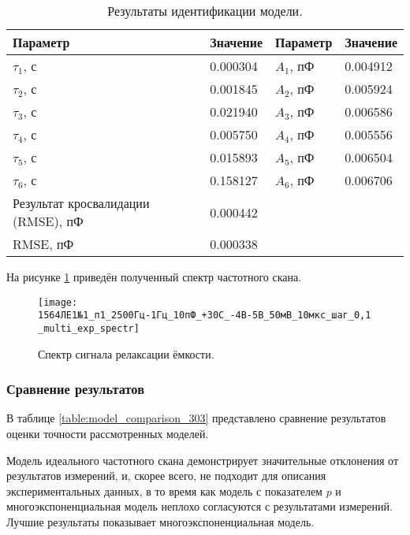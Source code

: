 	\begin{table}[!htp]
		\centering
		\caption{Результаты идентификации модели.}
		\begin{tabular}{|l|l|l|l|}
			\hline
			Параметр                           & Значение & Параметр  & Значение \\ \hline
			$\tau_1$, с                        & 0.000304 & $A_1$, пФ & 0.004912 \\ \hline
			$\tau_2$, с                        & 0.001845 & $A_2$, пФ & 0.005924 \\ \hline
			$\tau_3$, с                        & 0.021940 & $A_3$, пФ & 0.006586 \\ \hline
			$\tau_4$, с                        & 0.005750 & $A_4$, пФ & 0.005556 \\ \hline
			$\tau_5$, с                        & 0.015893 & $A_5$, пФ & 0.006504 \\ \hline
			$\tau_6$, с                        & 0.158127 & $A_6$, пФ & 0.006706 \\ \hline
			Результат кросвалидации (RMSE), пФ & 0.000442 &           &          \\ \hline
			RMSE, пФ                           & 0.000338 &           &          \\ \hline
		\end{tabular}
		\label{table:multi_exp_results_303}
	\end{table}

	На рисунке \ref{pic:multi_exp_spectr_303} приведён полученный спектр 
	частотного скана.

	\begin{figure}[!htp]
		\centering
		\texttt{[image: 1564ЛЕ1№1\_п1\_2500Гц-1Гц\_10пФ\_+30С\_-4В-5В\_50мВ\_10мкс\_шаг\_0,1\_multi\_exp\_spectr]}
		\caption{Спектр сигнала релаксации ёмкости.}
		\label{pic:multi_exp_spectr_303}
	\end{figure}


	\newpage
	\subsubsection{Сравнение результатов}
	В таблице \ref{table:model_comparison_303} представлено сравнение результатов
	оценки точности рассмотренных моделей. 

	Модель идеального частотного скана демонстрирует значительные отклонения от
	результатов измерений, и, скорее всего, не подходит для описания экспериментальных
	данных, в то время как модель с показателем $p$ и многоэкспоненциальная модель
	неплохо согласуются с результатами измерений. Лучшие результаты показывает
	многоэкспоненциальная модель.
	
